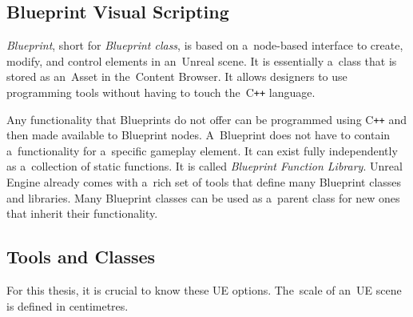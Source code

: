 \subsection{Blueprint Visual Scripting}
\emph{Blueprint}, short for \emph{Blueprint class}, is based on a~node-based interface to create, modify, and control elements in an~Unreal scene. It is essentially a~class that is stored as an~Asset in the~Content Browser. It allows designers to use programming tools without having to touch the~C\texttt{++} language. 

Any functionality that Blueprints do not offer can be programmed using C\texttt{++} and then made available to Blueprint nodes. A~Blueprint does not have to contain a~functionality for a~specific gameplay element. It can exist fully independently as a~collection of static functions. It is called \emph{Blueprint Function Library}. Unreal Engine already comes with a~rich set of tools that define many Blueprint classes and libraries. Many Blueprint classes can be used as a~parent class for new ones that inherit their functionality.

\subsection{Tools and Classes}
For this thesis, it is crucial to know these UE options. The~scale of an~UE scene is defined in centimetres.

